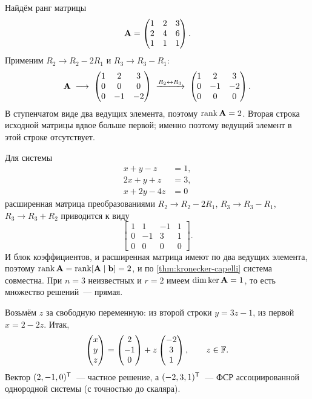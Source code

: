 \begin{example}
\label{ex:rank-compute}
Найдём ранг матрицы
\[
  \mathbf{A} = \begin{pmatrix}
    1 & 2 & 3 \\
    2 & 4 & 6 \\
    1 & 1 & 1
  \end{pmatrix}.
\]
Применим $R_2 \to R_2 - 2R_1$ и $R_3 \to R_3 - R_1$:
\[
  \mathbf{A} \;\longrightarrow\;
  \begin{pmatrix}
    1 & 2 & 3 \\
    0 & 0 & 0 \\
    0 & -1 & -2
  \end{pmatrix}
  \;\xrightarrow{R_2 \leftrightarrow R_3}\;
  \begin{pmatrix}
    1 & 2 & 3 \\
    0 & -1 & -2 \\
    0 & 0 & 0
  \end{pmatrix}.
\]
В ступенчатом виде два ведущих элемента, поэтому $\operatorname{rank} \mathbf{A} = 2$.
Вторая строка исходной матрицы вдвое больше первой; именно поэтому
ведущий элемент в этой строке отсутствует.
\end{example}

\begin{example}
\label{ex:kc-general-solution}
Для системы
\[
  \begin{aligned}
    x + y - z &= 1, \\
    2x + y + z &= 3, \\
    x + 2y - 4z &= 0
  \end{aligned}
\]
расширенная матрица преобразованиями $R_2 \to R_2 - 2R_1$,
$R_3 \to R_3 - R_1$, $R_3 \to R_3 + R_2$ приводится к виду
\[
  \left[\begin{array}{rrr|r}
    1 & 1 & -1 & 1 \\
    0 & -1 & 3 & 1 \\
    0 & 0 & 0 & 0
  \end{array}\right].
\]
И блок коэффициентов, и расширенная матрица имеют по два ведущих
элемента, поэтому $\operatorname{rank} \mathbf{A} = \operatorname{rank} [\mathbf{A} \mid \mathbf{b}] = 2$,
и по \cref{thm:kronecker-capelli} система совместна. При $n = 3$
неизвестных и $r = 2$ имеем $\dim \ker \mathbf{A} = 1$, то есть множество
решений~--- прямая.

Возьмём $z$ за свободную переменную: из второй строки $y = 3z - 1$,
из первой $x = 2 - 2z$. Итак,
\[
  \begin{pmatrix} x \\ y \\ z \end{pmatrix}
  =
  \begin{pmatrix} 2 \\ -1 \\ 0 \end{pmatrix}
  + z \begin{pmatrix} -2 \\ 3 \\ 1 \end{pmatrix},
  \qquad z \in \mathbb{F}.
\]
Вектор $(2, -1, 0)^{\mathsf{T}}$~--- частное решение, а $(-2, 3, 1)^{\mathsf{T}}$~---
ФСР ассоциированной однородной системы (с точностью до скаляра).
\end{example}

